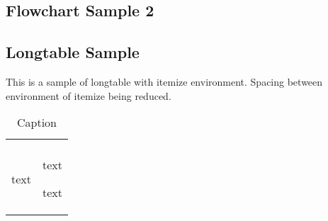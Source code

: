 \documentclass[../main.tex]{subfiles}
\begin{document}
\subsection{Flowchart Sample 2 }

\lipsum[3-4]
%
%
%
%
%
%

\subsection{Longtable Sample}
This is a sample of longtable with itemize environment. Spacing between environment of itemize being reduced.
\begin{longtable}{p{} p{}}
	\caption{Caption} \\
	\label{tab:label} \\
	text & \multicolumn{1}{i{.4\textwidth}}{\item text \item text}\\

\end{longtable}





\end{document}
